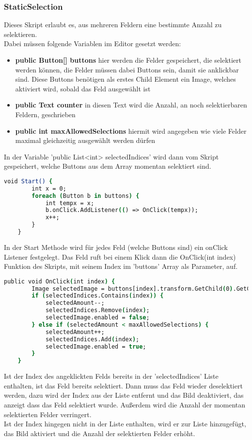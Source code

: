{\subsubsection{StaticSelection}
Dieses Skript erlaubt es, aus mehreren Feldern eine bestimmte Anzahl zu selektieren.\\
Dabei müssen folgende Variablen im Editor gesetzt werden:
\begin{itemize}
\item \textbf{public Button[] buttons} hier werden die Felder gespeichert, die selektiert werden können, die Felder müssen dabei Buttons sein, damit sie anklickbar sind. Diese Buttons benötigen als erstes Child Element ein Image, welches aktiviert wird, sobald das Feld ausgewählt ist
\item \textbf{public Text counter} in diesen Text wird die Anzahl, an noch selektierbaren Feldern, geschrieben
\item \textbf{public int maxAllowedSelections} hiermit wird angegeben wie viele Felder maximal gleichzeitig ausgewählt werden dürfen
\end{itemize}
In der Variable 'public List<int> selectedIndices' wird dann vom Skript gespeichert, welche Buttons aus dem Array momentan selektiert sind.\\
\begin{lstlisting}[language=csh, caption={Start Methode des StaticSelection Skripts}]
void Start() {
        int x = 0;
        foreach (Button b in buttons) {
            int tempx = x;
            b.onClick.AddListener(() => OnClick(tempx));
            x++;
        }
    }
\end{lstlisting}
In der Start Methode wird für jedes Feld (welche Buttons sind) ein onClick Listener festgelegt. Das Feld ruft bei einem Klick dann die OnClick(int index) Funktion des Skripts, mit seinem Index im 'buttons' Array als Parameter, auf.
\begin{lstlisting}[language=csh, caption={OnClick Methode des StaticSelection Skripts}]
public void OnClick(int index) {
        Image selectedImage = buttons[index].transform.GetChild(0).GetComponent<Image>();
        if (selectedIndices.Contains(index)) {
            selectedAmount--;
            selectedIndices.Remove(index);
            selectedImage.enabled = false;
        } else if (selectedAmount < maxAllowedSelections) {
            selectedAmount++;
            selectedIndices.Add(index);
            selectedImage.enabled = true;
        }
    }
\end{lstlisting}
Ist der Index des angeklickten Felds bereits in der 'selectedIndices' Liste enthalten, ist das Feld bereits selektiert. Dann muss das Feld wieder deselektiert werden, dazu wird der Index aus der Liste entfernt und das Bild deaktiviert, das anzeigt dass das Feld selektiert wurde. Außerdem wird die Anzahl der momentan selektierten Felder verringert.\\
Ist der Index hingegen nicht in der Liste enthalten, wird er zur Liste hinzugefügt, das Bild aktiviert und die Anzahl der selektierten Felder erhöht.\\

}
